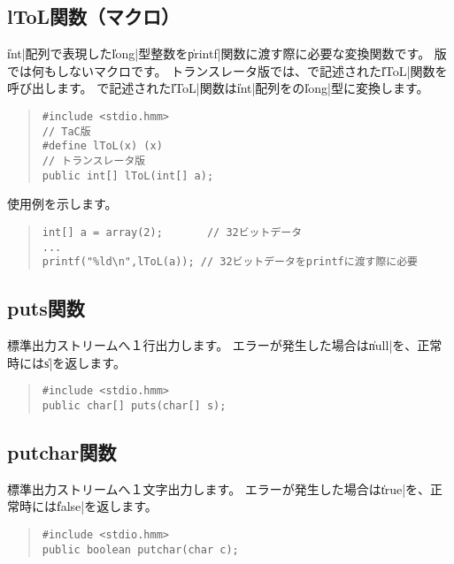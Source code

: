 \subsection{lToL関数（マクロ）}

\|int|配列で表現した\|long|型整数を\|printf|関数に渡す際に必要な変換関数です。
\tac 版では何もしないマクロです。
トランスレータ版では、{\cl}で記述された\|lToL|関数を呼び出します。
{\cl}で記述された\|lToL|関数は\|int|配列を{\cl}の\|long|型に変換します。

\begin{quote}
\begin{verbatim}
#include <stdio.hmm>
// TaC版
#define lToL(x) (x)
// トランスレータ版
public int[] lToL(int[] a);
\end{verbatim}
\end{quote}

使用例を示します。

\begin{quote}
\begin{verbatim}
int[] a = array(2);       // 32ビットデータ
...
printf("%ld\n",lToL(a)); // 32ビットデータをprintfに渡す際に必要
\end{verbatim}
\end{quote}

\subsection{puts関数}

標準出力ストリームへ１行出力します。
エラーが発生した場合は\|null|を、正常時には\|s|を返します。

\begin{quote}
\begin{verbatim}
#include <stdio.hmm>
public char[] puts(char[] s);
\end{verbatim}
\end{quote}

\subsection{putchar関数}

標準出力ストリームへ１文字出力します。
エラーが発生した場合は\|true|を、正常時には\|false|を返します。

\begin{quote}
\begin{verbatim}
#include <stdio.hmm>
public boolean putchar(char c);
\end{verbatim}
\end{quote}

